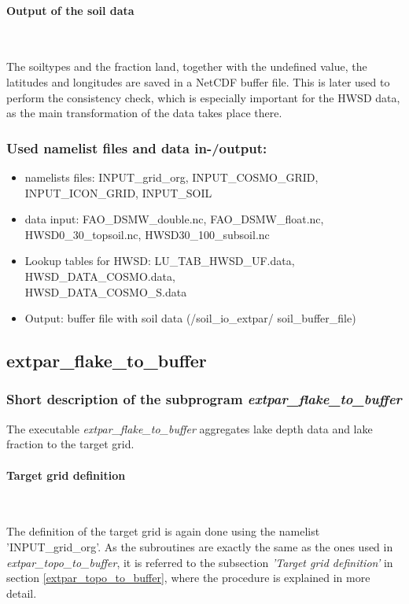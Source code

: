\documentclass[a4paper,10pt,DIV14,BCOR1cm,titlepage,twoside]{scrartcl}
\begin{document}
\paragraph{Output of the soil data}\ \par\medskip\noindent
The soiltypes and the fraction land, together with the undefined value, the latitudes and longitudes are saved in a NetCDF buffer file. This is later used to perform the consistency check, which is especially important for the HWSD data, as the main transformation of the data takes place there. \par\medskip\noindent
\subsubsection{Used namelist files and data in-/output:}
\begin{itemize}
 \item namelists files: INPUT\_grid\_org, INPUT\_COSMO\_GRID, INPUT\_ICON\_GRID, INPUT\_SOIL
\item data input: FAO\_DSMW\_double.nc, FAO\_DSMW\_float.nc, \\
    HWSD0\_30\_topsoil.nc, HWSD30\_100\_subsoil.nc
\item Lookup tables for HWSD: LU\_TAB\_HWSD\_UF.data, HWSD\_DATA\_COSMO.data,\\ HWSD\_DATA\_COSMO\_S.data
\item Output: buffer file with soil data (/soil\_io\_extpar/ soil\_buffer\_file)
\end{itemize}
\subsection{extpar\_flake\_to\_buffer}\label{extpar_flake_to_buffer}
\subsubsection{Short description of the subprogram \textit{extpar\_flake\_to\_buffer}}
The executable \textit{extpar\_flake\_to\_buffer} aggregates lake depth data and lake fraction to the target grid.\par\medskip\noindent
\paragraph{Target grid definition} \ \par\medskip\noindent
The definition of the target grid is again done using the namelist 'INPUT\_grid\_org'. As the subroutines are exactly the same as the ones used in \textit{extpar\_topo\_to\_buffer}, it is referred to the subsection \textit{'Target grid definition'} in section \ref{extpar_topo_to_buffer}, where the procedure is explained in more detail. \par\medskip\noindent
\end{document}
